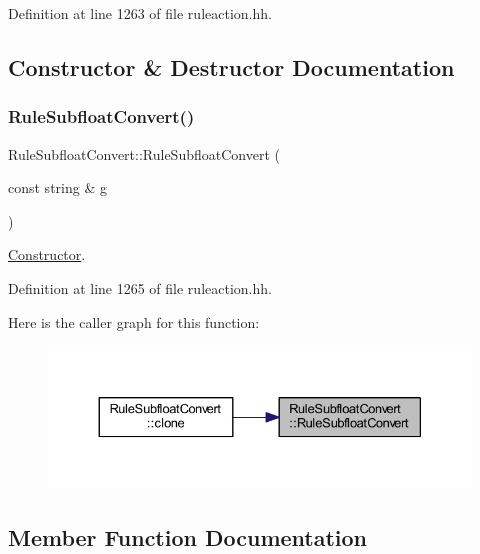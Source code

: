 Definition at line 1263 of file ruleaction.\+hh.



\subsection{Constructor \& Destructor Documentation}
\mbox{\label{class_rule_subfloat_convert_af755e88d66f2d4b0103c2fcda26b55e0}} 
\subsubsection{\texorpdfstring{RuleSubfloatConvert()}{RuleSubfloatConvert()}}
{\footnotesize\ttfamily Rule\+Subfloat\+Convert\+::\+Rule\+Subfloat\+Convert (\begin{DoxyParamCaption}\item[{const string \&}]{g }\end{DoxyParamCaption})\hspace{0.3cm}{\ttfamily [inline]}}



\mbox{\hyperlink{class_constructor}{Constructor}}. 



Definition at line 1265 of file ruleaction.\+hh.

Here is the caller graph for this function\+:
\nopagebreak
\begin{figure}[H]
\begin{center}
\leavevmode
\includegraphics[width=330pt]{class_rule_subfloat_convert_af755e88d66f2d4b0103c2fcda26b55e0_icgraph}
\end{center}
\end{figure}


\subsection{Member Function Documentation}
\mbox{\label{class_rule_subfloat_convert_a53fecdf028f4d41f37ff015677d7731d}} 
